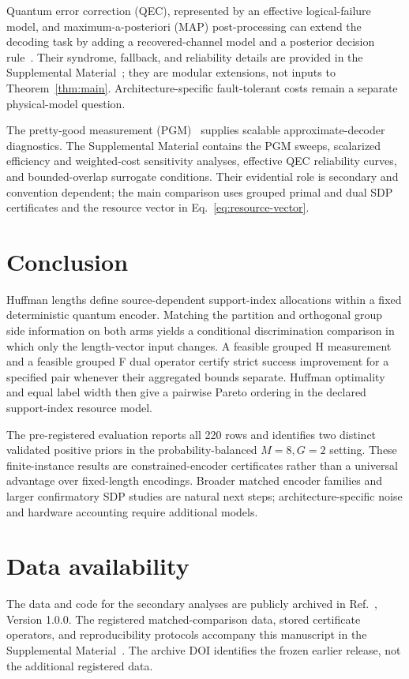 \documentclass[reprint,amsmath,amssymb,aps,pra,floatfix]{revtex4-2}
\begin{document}
Quantum error correction (QEC), represented by an effective logical-failure model, and maximum-a-posteriori (MAP) post-processing can extend the decoding task by adding a recovered-channel model and a posterior decision rule~\cite{nielsen2010quantum,terhal2015quantum,berger1985statistical}. Their syndrome, fallback, and reliability details are provided in the Supplemental Material~\cite{supplemental_material}; they are modular extensions, not inputs to Theorem~\ref{thm:main}. Architecture-specific fault-tolerant costs remain a separate physical-model question.

The pretty-good measurement (PGM)~\cite{hausladen1994pretty,eldar2001quantum} supplies scalable approximate-decoder diagnostics. The Supplemental Material contains the PGM sweeps, scalarized efficiency and weighted-cost sensitivity analyses, effective QEC reliability curves, and bounded-overlap surrogate conditions. Their evidential role is secondary and convention dependent; the main comparison uses grouped primal and dual SDP certificates and the resource vector in Eq.~\eqref{eq:resource-vector}.

\section{Conclusion}
Huffman lengths define source-dependent support-index allocations within a fixed deterministic quantum encoder. Matching the partition and orthogonal group side information on both arms yields a conditional discrimination comparison in which only the length-vector input changes. A feasible grouped H measurement and a feasible grouped F dual operator certify strict success improvement for a specified pair whenever their aggregated bounds separate. Huffman optimality and equal label width then give a pairwise Pareto ordering in the declared support-index resource model.

The pre-registered evaluation reports all 220 rows and identifies two distinct validated positive priors in the probability-balanced $M=8,G=2$ setting. These finite-instance results are constrained-encoder certificates rather than a universal advantage over fixed-length encodings. Broader matched encoder families and larger confirmatory SDP studies are natural next steps; architecture-specific noise and hardware accounting require additional models.

\FloatBarrier
\section*{Data availability}
The data and code for the secondary analyses are publicly archived in Ref.~\cite{xue_zhang_zenodo_2026}, Version 1.0.0. The registered matched-comparison data, stored certificate operators, and reproducibility protocols accompany this manuscript in the Supplemental Material~\cite{supplemental_material}. The archive DOI identifies the frozen earlier release, not the additional registered data.


\end{document}
